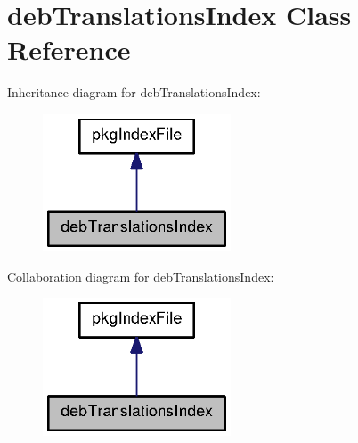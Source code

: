 \section{deb\-Translations\-Index \-Class \-Reference}
\label{classdebTranslationsIndex}


\-Inheritance diagram for deb\-Translations\-Index\-:
\nopagebreak
\begin{figure}[H]
\begin{center}
\leavevmode
\includegraphics[width=158pt]{classdebTranslationsIndex__inherit__graph}
\end{center}
\end{figure}


\-Collaboration diagram for deb\-Translations\-Index\-:
\nopagebreak
\begin{figure}[H]
\begin{center}
\leavevmode
\includegraphics[width=158pt]{classdebTranslationsIndex__coll__graph}
\end{center}
\end{figure}

